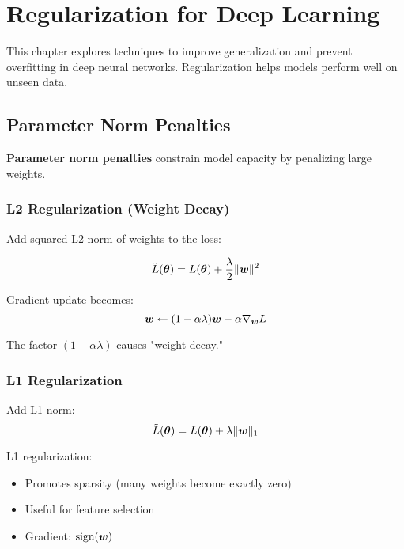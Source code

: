 
\chapter{Regularization for Deep Learning}
\label{chap:regularization}

This chapter explores techniques to improve generalization and prevent overfitting in deep neural networks. Regularization helps models perform well on unseen data.

\section{Parameter Norm Penalties}
\label{sec:parameter-penalties}

\textbf{Parameter norm penalties} constrain model capacity by penalizing large weights.

\subsection{L2 Regularization (Weight Decay)}

Add squared L2 norm of weights to the loss:

\begin{equation}
\tilde{L}(\boldsymbol{\theta}) = L(\boldsymbol{\theta}) + \frac{\lambda}{2} \|\boldsymbol{w}\|^2
\end{equation}

Gradient update becomes:
\begin{equation}
\boldsymbol{w} \leftarrow (1 - \alpha\lambda)\boldsymbol{w} - \alpha \nabla_{\boldsymbol{w}} L
\end{equation}

The factor $(1 - \alpha\lambda)$ causes "weight decay."

\subsection{L1 Regularization}

Add L1 norm:
\begin{equation}
\tilde{L}(\boldsymbol{\theta}) = L(\boldsymbol{\theta}) + \lambda \|\boldsymbol{w}\|_1
\end{equation}

L1 regularization:
\begin{itemize}
    \item Promotes sparsity (many weights become exactly zero)
    \item Useful for feature selection
    \item Gradient: $\text{sign}(\boldsymbol{w})$
\end{itemize}


